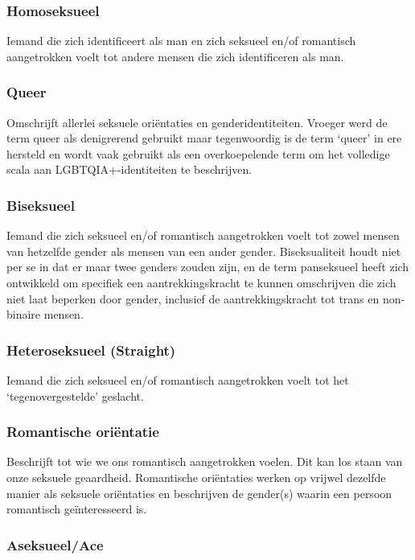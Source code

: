 \documentclass[12pt,openany]{book}
\begin{document}
\subsubsection*{Homoseksueel}

Iemand die zich identificeert als man en zich seksueel en/of romantisch aangetrokken voelt tot andere mensen die zich identificeren als man.

\subsubsection*{Queer}

Omschrijft allerlei seksuele oriëntaties en genderidentiteiten. Vroeger werd de term queer als denigrerend gebruikt maar tegenwoordig is de term `queer' in ere hersteld en wordt vaak gebruikt als een overkoepelende term om het volledige scala aan LGBTQIA+-identiteiten te beschrijven.  

\subsubsection*{Biseksueel}

Iemand die zich seksueel en/of romantisch aangetrokken voelt tot zowel mensen van hetzelfde gender als mensen van een ander gender. Biseksualiteit houdt niet per se in dat er maar twee genders zouden zijn, en de term panseksueel heeft zich ontwikkeld om specifiek een aantrekkingskracht te kunnen omschrijven die zich niet laat beperken door gender, inclusief de aantrekkingskracht tot trans en non-binaire mensen.

\subsubsection*{Heteroseksueel (Straight)}

Iemand die zich seksueel en/of romantisch aangetrokken voelt tot het `tegenovergestelde' geslacht.

\subsubsection*{Romantische oriëntatie}

Beschrijft tot wie we ons romantisch aangetrokken voelen. Dit kan los staan van onze seksuele geaardheid. Romantische oriëntaties werken op vrijwel dezelfde manier als seksuele oriëntaties en beschrijven de gender(s) waarin een persoon romantisch geïnteresseerd is.

\subsubsection*{Aseksueel/Ace}
\end{document}

